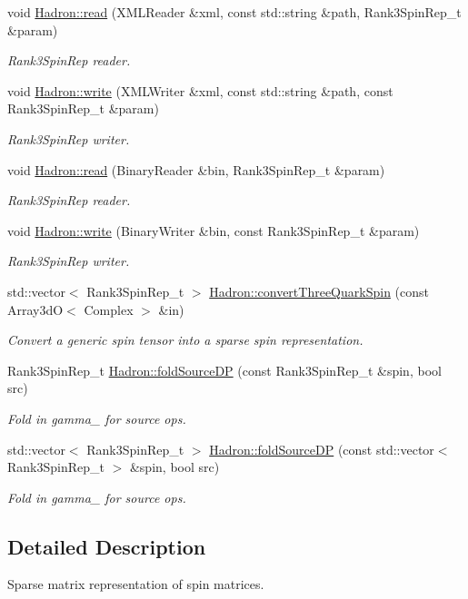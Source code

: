 \begin{DoxyCompactItemize}
void \mbox{\hyperlink{namespaceHadron_a2d26ed6a48c098506babe8e03425a183}{Hadron\+::read}} (X\+M\+L\+Reader \&xml, const std\+::string \&path, Rank3\+Spin\+Rep\+\_\+t \&param)
\begin{DoxyCompactList}\small\item\em Rank3\+Spin\+Rep reader. \end{DoxyCompactList}\item 
void \mbox{\hyperlink{namespaceHadron_a4286761aeb6d750c12bfba02d54b2b12}{Hadron\+::write}} (X\+M\+L\+Writer \&xml, const std\+::string \&path, const Rank3\+Spin\+Rep\+\_\+t \&param)
\begin{DoxyCompactList}\small\item\em Rank3\+Spin\+Rep writer. \end{DoxyCompactList}\item 
void \mbox{\hyperlink{namespaceHadron_aa7d26a465958f014ffb6f4cb4d45a389}{Hadron\+::read}} (Binary\+Reader \&bin, Rank3\+Spin\+Rep\+\_\+t \&param)
\begin{DoxyCompactList}\small\item\em Rank3\+Spin\+Rep reader. \end{DoxyCompactList}\item 
void \mbox{\hyperlink{namespaceHadron_ae2b761452803d14604c4471a4cf35ca3}{Hadron\+::write}} (Binary\+Writer \&bin, const Rank3\+Spin\+Rep\+\_\+t \&param)
\begin{DoxyCompactList}\small\item\em Rank3\+Spin\+Rep writer. \end{DoxyCompactList}\item 
std\+::vector$<$ Rank3\+Spin\+Rep\+\_\+t $>$ \mbox{\hyperlink{namespaceHadron_abbb775633773ccb52dcaef4974305df9}{Hadron\+::convert\+Three\+Quark\+Spin}} (const Array3dO$<$ Complex $>$ \&in)
\begin{DoxyCompactList}\small\item\em Convert a generic spin tensor into a sparse spin representation. \end{DoxyCompactList}\item 
Rank3\+Spin\+Rep\+\_\+t \mbox{\hyperlink{namespaceHadron_a9a1884dbfb0a2eb11bd7d4e6585e6966}{Hadron\+::fold\+Source\+DP}} (const Rank3\+Spin\+Rep\+\_\+t \&spin, bool src)
\begin{DoxyCompactList}\small\item\em Fold in gamma\+\_ for source ops. \end{DoxyCompactList}\item 
std\+::vector$<$ Rank3\+Spin\+Rep\+\_\+t $>$ \mbox{\hyperlink{namespaceHadron_a121d64f8eb61ea3fc51116de1c659ee5}{Hadron\+::fold\+Source\+DP}} (const std\+::vector$<$ Rank3\+Spin\+Rep\+\_\+t $>$ \&spin, bool src)
\begin{DoxyCompactList}\small\item\em Fold in gamma\+\_ for source ops. \end{DoxyCompactList}\end{DoxyCompactItemize}


\subsection{Detailed Description}
Sparse matrix representation of spin matrices. 

